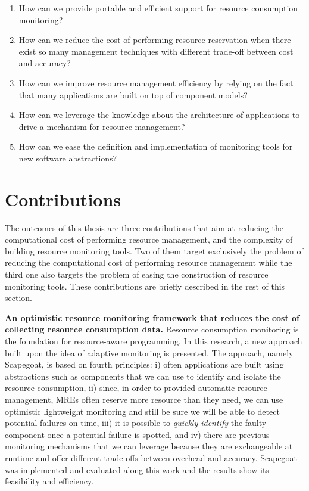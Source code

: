 \begin{enumerate}
\item How can we provide portable and efficient support for resource consumption monitoring?
\item How can we reduce the cost of performing resource reservation when there exist so many management techniques with different trade-off between cost and accuracy?
\item How can we improve resource management efficiency by relying on the fact that many applications are built on top of component models?
\item How can we leverage the knowledge about the architecture of applications to drive a mechanism for resource management?
\item How can we ease the definition and implementation of monitoring tools for new software abstractions?
\end{enumerate}
 
\section{Contributions}

The outcomes of this thesis are three contributions that aim at reducing the computational cost of performing resource management, and the complexity of building resource monitoring tools.
Two of them target exclusively the problem of reducing the computational cost of performing resource management while the third one also targets the problem of easing the construction of resource monitoring tools. 
These contributions are briefly described in the rest of this section.

\textbf{An optimistic resource monitoring framework that reduces the cost of collecting resource consumption data.}
Resource consumption monitoring is the foundation for resource-aware programming.
In this research, a new approach built upon the idea of adaptive monitoring is presented.
The approach, namely Scapegoat, is based on fourth principles: i) often applications are built using abstractions such as components that we can use to identify and isolate the resource consumption, ii) since, in order to provided automatic resource management, MREs often reserve more resource than they need, we can use optimistic lightweight monitoring and still be sure we will be able to detect potential failures on time, iii) it is possible to \textit{quickly identify} the faulty component once a potential failure is spotted, and iv) there are previous monitoring mechanisms that we can leverage because they are exchangeable at runtime and offer different trade-offs between overhead and accuracy.
Scapegoat was implemented and evaluated along this work and the results show its feasibility and efficiency.

